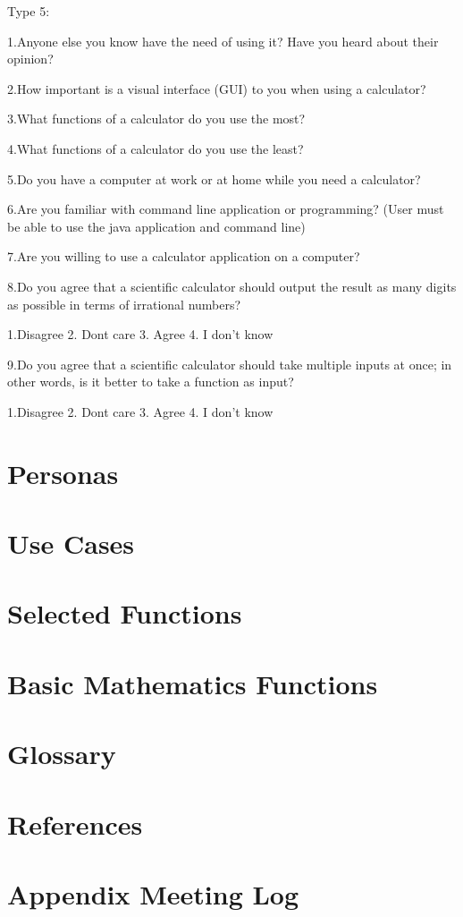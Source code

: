 \documentclass[12pt]{article}
\begin{document}
Type 5:

1.Anyone else you know have the need of using it? Have you heard about their opinion? 
 
2.How important is a visual interface (GUI) to you when using a calculator?

3.What functions of a calculator do you use the most?

4.What functions of a calculator do you use the least?

5.Do you have a computer at work or at home while you need a calculator?

6.Are you familiar with command line application or programming?  (User must be able to use the java application and command line)

7.Are you willing to use a calculator application on a computer?

8.Do you agree that a scientific calculator should output the result as many digits as possible in terms of irrational numbers?

1.Disagree  2. Dont care 3. Agree 4. I don't know

9.Do you agree that a scientific calculator should take multiple inputs at once; in other words, is it better to take a function as input?

1.Disagree  2. Dont care 3. Agree 4. I don't know
\newpage
\section{Personas}

\newpage
\section{Use Cases}

\newpage
\section{Selected Functions}

\newpage
\section{Basic Mathematics Functions}

\newpage
\section{Glossary}

\newpage
\section{References}

\newpage
\section{Appendix Meeting Log}
\end{document}
